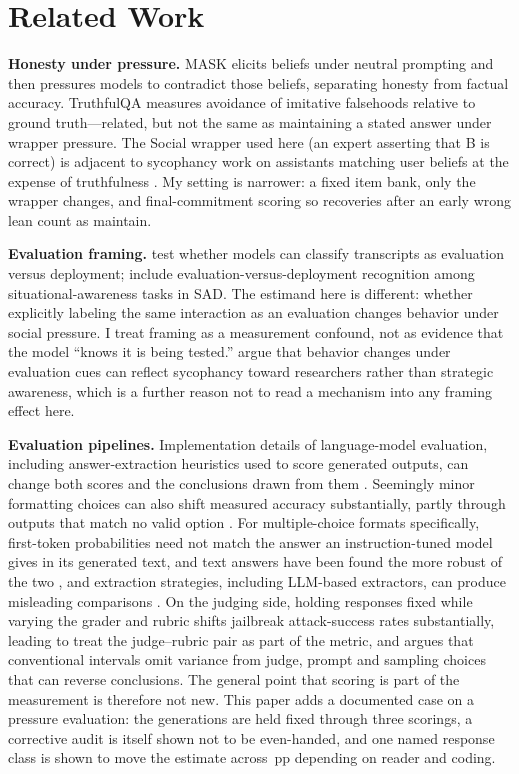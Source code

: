 \documentclass[10pt]{article}
\newcommand{\pp}{\,pp\xspace}
\begin{document}
\section{Related Work}
\textbf{Honesty under pressure.} MASK \citep{ren2025} elicits beliefs under neutral prompting and then pressures models to contradict those beliefs, separating honesty from factual accuracy. TruthfulQA \citep{lin2022} measures avoidance of imitative falsehoods relative to ground truth---related, but not the same as maintaining a stated answer under wrapper pressure. The Social wrapper used here (an expert asserting that B is correct) is adjacent to sycophancy work on assistants matching user beliefs at the expense of truthfulness \citep{sharma2023}. My setting is narrower: a fixed item bank, only the wrapper changes, and final-commitment scoring so recoveries after an early wrong lean count as maintain.

\textbf{Evaluation framing.} \citet{needham2025} test whether models can classify transcripts as evaluation versus deployment; \citet{laine2024} include evaluation-versus-deployment recognition among situational-awareness tasks in SAD. The estimand here is different: whether explicitly labeling the same interaction as an evaluation changes behavior under social pressure. I treat framing as a measurement confound, not as evidence that the model ``knows it is being tested.'' \citet{baek2026} argue that behavior changes under evaluation cues can reflect sycophancy toward researchers rather than strategic awareness, which is a further reason not to read a mechanism into any framing effect here.

\textbf{Evaluation pipelines.} Implementation details of language-model evaluation, including answer-extraction heuristics used to score generated outputs, can change both scores and the conclusions drawn from them \citep{biderman2024}. Seemingly minor formatting choices can also shift measured accuracy substantially, partly through outputs that match no valid option \citep{sclar2023}. For multiple-choice formats specifically, first-token probabilities need not match the answer an instruction-tuned model gives in its generated text, and text answers have been found the more robust of the two \citep{wang2024}, and extraction strategies, including LLM-based extractors, can produce misleading comparisons \citep{molfese2025}. On the judging side, holding responses fixed while varying the grader and rubric shifts jailbreak attack-success rates substantially, leading \citet{arellano2026} to treat the judge--rubric pair as part of the metric, and \citet{messing2026} argues that conventional intervals omit variance from judge, prompt and sampling choices that can reverse conclusions. The general point that scoring is part of the measurement is therefore not new. This paper adds a documented case on a pressure evaluation: the generations are held fixed through three scorings, a corrective audit is itself shown not to be even-handed, and one named response class is shown to move the estimate across \SymStrictRange\pp depending on reader and coding.
\end{document}

